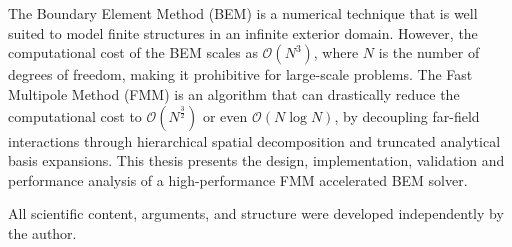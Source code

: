 \chapter*{\abstractname}

The Boundary Element Method (BEM) is a numerical technique that is well suited to model finite structures in an infinite exterior domain. However, the computational cost of the BEM scales as $\mathcal{O}(N^3)$, where $N$ is the number of degrees of freedom, making it prohibitive for large-scale problems. The Fast Multipole Method (FMM) is an algorithm that can drastically reduce the computational cost to $\mathcal{O}(N^{\frac{3}{2}})$ or even $\mathcal{O}(N \log N)$, by decoupling far-field interactions through hierarchical spatial decomposition and truncated analytical basis expansions. This thesis presents the design, implementation, validation and performance analysis of a high-performance \ac{FMM} accelerated \ac{BEM} solver.

\vfill

\begin{insetBox}[title={AI use disclosure}, colback=TUMLightGray!40, colframe=TUMBlue!80!black]
    
    All scientific content, arguments, and structure were developed independently by the author.
\end{insetBox}